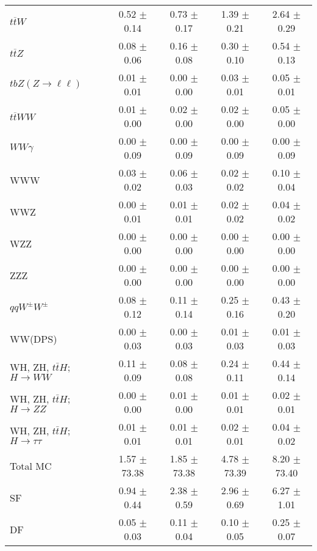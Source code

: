 \begin{tabular}{l|cccc}
                   $t\overline{t}W$ &  0.52 $\pm$  0.14 &  0.73 $\pm$  0.17 &  1.39 $\pm$  0.21 &  2.64 $\pm$  0.29 \\
                   $t\overline{t}Z$ &  0.08 $\pm$  0.06 &  0.16 $\pm$  0.08 &  0.30 $\pm$  0.10 &  0.54 $\pm$  0.13 \\
    $tbZ (Z \rightarrow \ell \ell)$ &  0.01 $\pm$  0.01 &  0.00 $\pm$  0.00 &  0.03 $\pm$  0.01 &  0.05 $\pm$  0.01 \\
                  $t\overline{t}WW$ &  0.01 $\pm$  0.00 &  0.02 $\pm$  0.00 &  0.02 $\pm$  0.00 &  0.05 $\pm$  0.00 \\
                         $WW\gamma$ &  0.00 $\pm$  0.09 &  0.00 $\pm$  0.09 &  0.00 $\pm$  0.09 &  0.00 $\pm$  0.09 \\
                                WWW &  0.03 $\pm$  0.02 &  0.06 $\pm$  0.03 &  0.02 $\pm$  0.02 &  0.10 $\pm$  0.04 \\
                                WWZ &  0.00 $\pm$  0.01 &  0.01 $\pm$  0.01 &  0.02 $\pm$  0.02 &  0.04 $\pm$  0.02 \\
                                WZZ &  0.00 $\pm$  0.00 &  0.00 $\pm$  0.00 &  0.00 $\pm$  0.00 &  0.00 $\pm$  0.00 \\
                                ZZZ &  0.00 $\pm$  0.00 &  0.00 $\pm$  0.00 &  0.00 $\pm$  0.00 &  0.00 $\pm$  0.00 \\
                 $qqW^{\pm}W^{\pm}$ &  0.08 $\pm$  0.12 &  0.11 $\pm$  0.14 &  0.25 $\pm$  0.16 &  0.43 $\pm$  0.20 \\
                            WW(DPS) &  0.00 $\pm$  0.03 &  0.00 $\pm$  0.03 &  0.01 $\pm$  0.03 &  0.01 $\pm$  0.03 \\
WH, ZH, $t\bar{t}H$; $H \rightarrow WW$ &  0.11 $\pm$  0.09 &  0.08 $\pm$  0.08 &  0.24 $\pm$  0.11 &  0.44 $\pm$  0.14 \\
WH, ZH, $t\bar{t}H$; $H \rightarrow ZZ$ &  0.00 $\pm$  0.00 &  0.01 $\pm$  0.00 &  0.01 $\pm$  0.01 &  0.02 $\pm$  0.01 \\
WH, ZH, $t\bar{t}H$; $H \rightarrow \tau\tau$ &  0.01 $\pm$  0.01 &  0.01 $\pm$  0.01 &  0.02 $\pm$  0.01 &  0.04 $\pm$  0.02 \\
\hline\hline
                           Total MC &  1.57 $\pm$ 73.38 &  1.85 $\pm$ 73.38 &  4.78 $\pm$ 73.39 &  8.20 $\pm$ 73.40 \\
\hline
                                 SF &  0.94 $\pm$  0.44 &  2.38 $\pm$  0.59 &  2.96 $\pm$  0.69 &  6.27 $\pm$  1.01 \\
                                 DF &  0.05 $\pm$  0.03 &  0.11 $\pm$  0.04 &  0.10 $\pm$  0.05 &  0.25 $\pm$  0.07 \\

\end{tabular}
